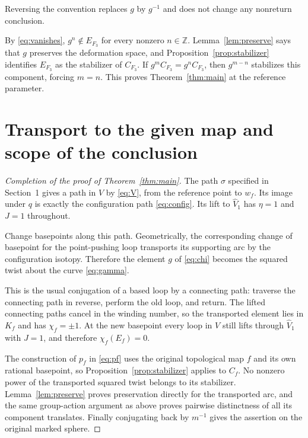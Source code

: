 \documentclass[11pt]{article}
\newcommand{\Z}{\mathbb Z}
\theoremstyle{remark}
\begin{document}
Reversing the convention replaces $g$ by $g^{-1}$ and does not change any nonreturn conclusion.

By \eqref{eq:vanishes}, $g^n\notin E_{F_3}$ for every nonzero $n\in\Z$. Lemma~\ref{lem:preserve} says that $g$ preserves the deformation space, and Proposition~\ref{prop:stabilizer} identifies $E_{F_3}$ as the stabilizer of $C_{F_3}$. If $g^mC_{F_3}=g^nC_{F_3}$, then $g^{m-n}$ stabilizes this component, forcing $m=n$. This proves Theorem~\ref{thm:main} at the reference parameter.

\section{Transport to the given map and scope of the conclusion}
\begin{proof}[Completion of the proof of Theorem~\ref{thm:main}]
The path $\sigma$ specified in Section~1 gives a path in $V$ by \eqref{eq:V}, from the reference point to $w_f$. Its image under $q$ is exactly the configuration path \eqref{eq:config}. Its lift to $\widehat V_1$ has $\eta=1$ and $J=1$ throughout.



Change basepoints along this path. 
Geometrically, the corresponding change of basepoint for the point-pushing loop transports its supporting arc by the configuration isotopy. Therefore the element $g$ of \eqref{eq:chi} becomes the squared twist about the curve \eqref{eq:gamma}. 


This is the usual conjugation of a based loop by a connecting path: traverse the connecting path in reverse, perform the old loop, and return. The lifted connecting paths cancel in the winding number, so the transported element lies in $K_f$ and has $\chi_f=\pm1$. At the new basepoint every loop in $V$ still lifts through $\widehat V_1$ with $J=1$, and therefore $\chi_f(E_f)=0$.

The construction of $p_f$ in \eqref{eq:pf} uses the original topological map $f$ and its own rational basepoint, so Proposition~\ref{prop:stabilizer} applies to $C_f$. No nonzero power of the transported squared twist belongs to its stabilizer. Lemma~\ref{lem:preserve} proves preservation directly for the transported arc, and the same group-action argument as above proves pairwise distinctness of all its component translates. Finally conjugating back by $m^{-1}$ gives the assertion on the original marked sphere.
\end{proof}
\end{document}
